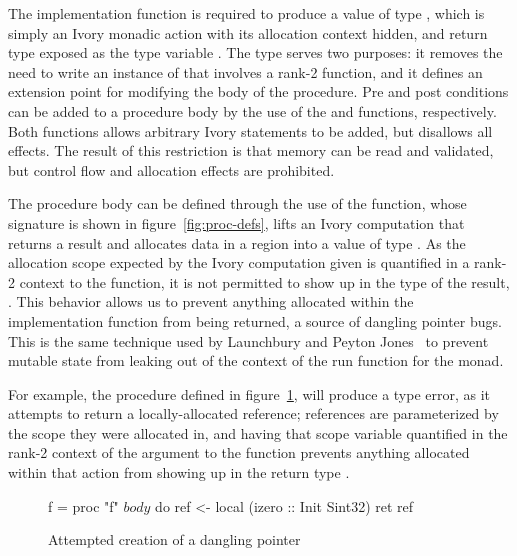 The implementation function is required to produce a value of type ,
which is simply an Ivory monadic action with its allocation context hidden, and
return type exposed as the type variable .  The  type serves two
purposes: it removes the need to write an instance of  that
involves a rank-2 function, and it defines an extension point for modifying the
body of the procedure.  Pre and post conditions can be added to a procedure body
by the use of the  and  functions, respectively.  Both
functions allows arbitrary Ivory statements to be added, but disallows all
effects.  The result of this restriction is that memory can be read and
validated, but control flow and allocation effects are prohibited.

The procedure body can be defined through the use of the  function,
whose signature is shown in figure~\ref{fig:proc-defs}, lifts an Ivory
computation that returns a result  and allocates data in a region 
into a value of type .  As the allocation scope expected by the Ivory
computation given is quantified in a rank-2 context to the  function,
it is not permitted to show up in the type of the result, .  This behavior
allows us to prevent anything allocated within the implementation function from
being returned, a source of dangling pointer bugs.  This is the same technique
used by Launchbury and Peyton Jones~\cite{stmonad} to prevent mutable state
from leaking out of the context of the run function for the  monad.

For example, the procedure  defined in figure~\ref{fig:proc-def}, will
produce a type error, as it attempts to return a locally-allocated reference;
references are parameterized by the scope they were allocated in, and having
that scope variable quantified in the rank-2 context of the argument to the
 function prevents anything allocated within that action from showing
up in the return type .

\begin{figure}[h]
\begin{code}
f = proc "f" $ body $ do
  ref <- local (izero :: Init Sint32)
  ret ref
\end{code}
\caption{Attempted creation of a dangling pointer}
\label{fig:proc-def}
\end{figure}

